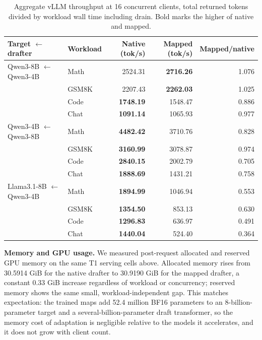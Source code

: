\begin{table}[t]
\centering
\caption{Aggregate vLLM throughput at 16 concurrent clients, total returned tokens divided by workload wall time including drain. Bold marks the higher of native and mapped.}
\label{tab:transfer-serving}
\small
\begin{tabular}{llrrr}
\toprule
Target $\leftarrow$ drafter & Workload & Native (tok/s) & Mapped (tok/s) & Mapped/native \\
\midrule
Qwen3-8B $\leftarrow$ Qwen3-4B & Math & 2524.31 & \textbf{2716.26} & 1.076 \\
 & GSM8K & 2207.43 & \textbf{2262.03} & 1.025 \\
 & Code & \textbf{1748.19} & 1548.47 & 0.886 \\
 & Chat & \textbf{1091.14} & 1065.93 & 0.977 \\
\midrule
Qwen3-4B $\leftarrow$ Qwen3-8B & Math & \textbf{4482.42} & 3710.76 & 0.828 \\
 & GSM8K & \textbf{3160.99} & 3078.87 & 0.974 \\
 & Code & \textbf{2840.15} & 2002.79 & 0.705 \\
 & Chat & \textbf{1888.69} & 1431.21 & 0.758 \\
\midrule
Llama3.1-8B $\leftarrow$ Qwen3-4B & Math & \textbf{1894.99} & 1046.94 & 0.553 \\
 & GSM8K & \textbf{1354.50} & 853.13 & 0.630 \\
 & Code & \textbf{1296.83} & 636.97 & 0.491 \\
 & Chat & \textbf{1440.04} & 524.40 & 0.364 \\
\bottomrule
\end{tabular}
\end{table}

\textbf{Memory and GPU usage.} We measured post-request allocated and reserved GPU memory on the same T1 serving cells above. Allocated memory rises from 30.5914 GiB for the native drafter to 30.9190 GiB for the mapped drafter, a constant 0.33 GiB increase regardless of workload or concurrency; reserved memory shows the same small, workload-independent gap. This matches expectation: the trained maps add 52.4 million BF16 parameters to an 8-billion-parameter target and a several-billion-parameter draft transformer, so the memory cost of adaptation is negligible relative to the models it accelerates, and it does not grow with client count.

